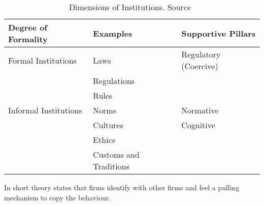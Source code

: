 \begin{table}[htb]
  \centering
  \caption[Dimensions of Institutions]{Dimensions of Institutions. Source~\cite{Peng:2008b}}\label{tab:peng2008}
\begin{tabularx}{0.8\textwidth}{XXX} 
  Degree of Formality & Examples & Supportive Pillars\\ 
  \midrule 
  \midrule
  Formal Institutions& Laws&  Regulatory (Coercive)\\
  &Regulations&\\
  &Rules&\\
  Informal Institutions&Norms &Normative \\
  & Cultures&Cognitive\\
  &Ethics&\\ 
  &Customs and Traditions&\\
  \bottomrule
\end{tabularx}
\end{table}

\noindent




In short theory states that firms identify with other firms and feel a pulling mechanism to copy the behaviour. 
